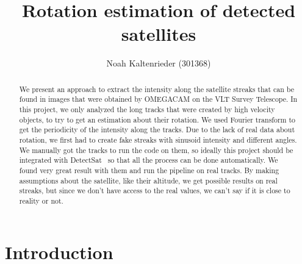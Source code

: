 \documentclass[a4paper,12pt,oneside]{report}
\title{Rotation estimation of detected satellites}
\author{Noah Kaltenrieder (301368)}
\begin{document}
\maketitle
{}
\makeacks

\begin{abstract}
We present an approach to extract the intensity along the satellite streaks that can be found in images that were obtained by OMEGACAM 
on the VLT Survey Telescope. In this project, we only analyzed the long tracks that were created by high velocity objects, to
try to get an estimation about their rotation. We used Fourier transform to get the periodicity of the intensity along the tracks.
Due to the lack of real data about rotation, we first had to create fake streaks with sinusoid intensity and different angles.
We manually got the tracks to run the code on them, so ideally this project should be integrated with DetectSat~\cite{detectsatRepository} so that all 
the process can be done automatically. We found very great result with them and run the pipeline on real tracks. By making assumptions about the satellite, 
like their altitude, we get possible results on real streaks, but since we don't have access to the real values, we can't say if it is close to reality or not.
\end{abstract}


\maketoc

\chapter{Introduction}
\end{document}
